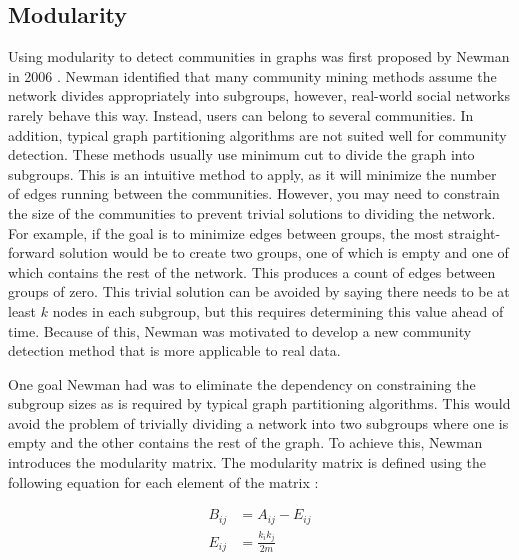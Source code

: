 \documentclass{article}
\begin{document}
    \subsection{Modularity}
    Using modularity to detect communities in graphs was first proposed by Newman in 2006 \cite{Newman2006}. Newman identified that many community mining methods assume the network divides appropriately into subgroups, however, real-world social networks rarely behave this way. Instead, users can belong to several communities. In addition, typical graph partitioning algorithms are not suited well for community detection. These methods usually use minimum cut to divide the graph into subgroups. This is an intuitive method to apply, as it will minimize the number of edges running between the communities. However, you may need to constrain the size of the communities to prevent trivial solutions to dividing the network. For example, if the goal is to minimize edges between groups, the most straight-forward solution would be to create two groups, one of which is empty and one of which contains the rest of the network. This produces a count of edges between groups of zero. This trivial solution can be avoided by saying there needs to be at least $k$ nodes in each subgroup, but this requires determining this value ahead of time. Because of this, Newman was motivated to develop a new community detection method that is more applicable to real data.
    \par
    One goal Newman had was to eliminate the dependency on constraining the subgroup sizes as is required by typical graph partitioning algorithms. This would avoid the problem of trivially dividing a network into two subgroups where one is empty and the other contains the rest of the graph. To achieve this, Newman introduces the modularity matrix. The modularity matrix is defined using the following equation for each element of the matrix \cite{Newman2006}:

    \begin{align}
        B_{ij} &= A_{ij} - E_{ij} \\
        E_{ij} &= \frac{k_ik_j}{2m}
    \end{align}
\end{document}
